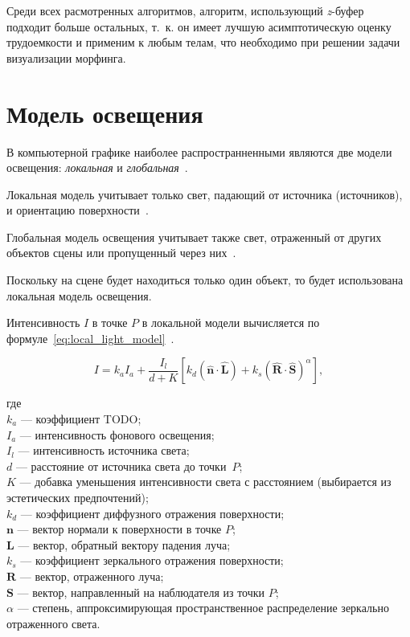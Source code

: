 Среди всех расмотренных алгоритмов, алгоритм, использующий \textit{z}-буфер подходит больше остальных, т.~к. он имеет лучшую асимптотическую оценку трудоемкости и применим к любым телам, что необходимо при решении задачи визуализации морфинга.


\section{Модель освещения}

В компьютерной графике наиболее распространненными являются две модели освещения: \textit{локальная} и \textit{глобальная}~\cite{rogers}.

Локальная модель учитывает только свет, падающий от источника (источников), и ориентацию поверхности~\cite{rogers}.

Глобальная модель освещения учитывает также свет, отраженный от других объектов сцены или пропущенный через них~\cite{rogers}.

Поскольку на сцене будет находиться только один объект, то будет использована локальная модель освещения.

Интенсивность $I$ в точке $P$ в локальной модели вычисляется по формуле~\eqref{eq:local_light_model}~\cite{rogers}.

\begin{equation}
    \label{eq:local_light_model}
    I = k_aI_a + \frac{I_l}{d + K}[k_d(\mathbf{\hat{n}\cdot \hat{L}})+k_s(\mathbf{\hat{R}\cdot \hat{S}})^\alpha],
\end{equation}

где \\
$k_a$ --- коэффициент TODO; \\
$I_a$ --- интенсивность фонового освещения; \\
$I_l$ --- интенсивность источника света; \\
$d$ --- расстояние от источника света до точки~$P$; \\
$K$ --- добавка уменьшения интенсивности света с расстоянием (выбирается из эстетических предпочтений); \\
$k_d$ --- коэффициент диффузного отражения поверхности; \\
$\mathbf{n}$ --- вектор нормали к поверхности в точке $P$; \\
$\mathbf{L}$ --- вектор, обратный вектору падения луча; \\
$k_s$ --- коэффициент зеркального отражения поверхности; \\
$\mathbf{R}$ --- вектор, отраженного луча; \\
$\mathbf{S}$ --- вектор, направленный на наблюдателя из точки $P$; \\
$\alpha$ --- степень, аппроксимирующая пространственное распределение зеркально отраженного света.


